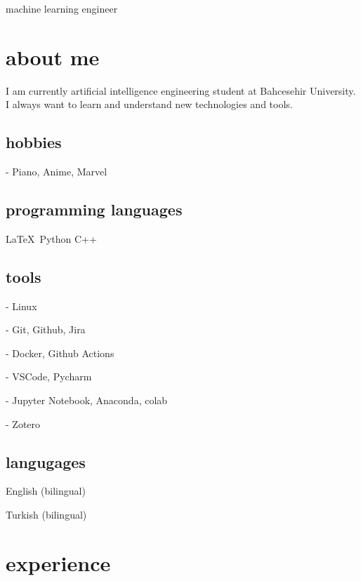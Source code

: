\documentclass{resume-class} %
\begin{document}
\makeprofile

machine learning engineer
\drawsidebar
\section{about me}

I am currently artificial intelligence engineering student at Bahcesehir University. I always want to learn and understand new technologies and tools.

\subsection{hobbies}

- Piano, Anime, Marvel


\subsection{programming languages}

\LaTeX\ Python C++

\subsection{tools}
- Linux

- Git, Github, Jira

- Docker, Github Actions

- VSCode, Pycharm

- Jupyter Notebook, Anaconda, colab

- Zotero


\subsection{langugages}

English (bilingual)

Turkish (bilingual)


\section{experience}
\blindtext
\end{document}
